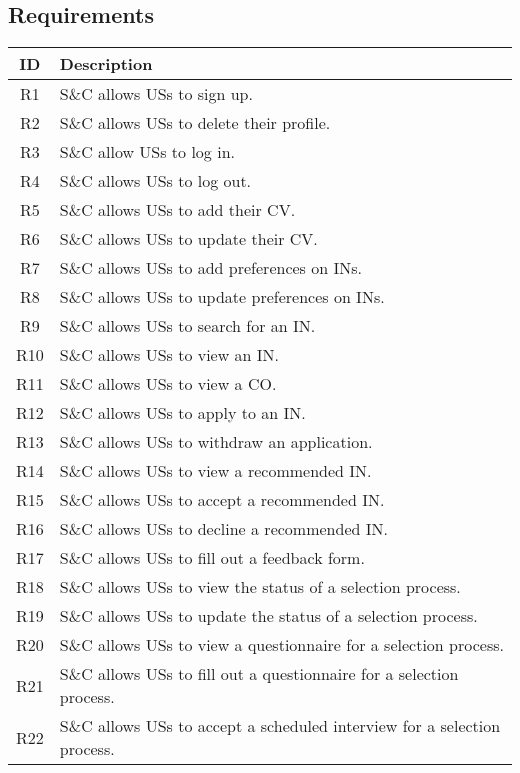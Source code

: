 \subsection{Requirements}
\renewcommand{\arraystretch}{1.5}
\begin{longtable}{|c|p{10.5cm}|}
    \hline \rowcolor{polimiblue!40}
    \textbf{ID} & \textbf{Description} \\ \hline
    R1 & S\&C allows USs to sign up. \\ \hline
    R2 & S\&C allows USs to delete their profile.\\ \hline
    R3 & S\&C allow USs to log in. \\ \hline
    R4 & S\&C allows USs to log out. \\ \hline
    R5 & S\&C allows USs to add their CV. \\ \hline
    R6 & S\&C allows USs to update their CV. \\ \hline
    R7 & S\&C allows USs to add preferences on INs. \\ \hline
    R8 & S\&C allows USs to update preferences on INs. \\ \hline
    R9 & S\&C allows USs to search for an IN. \\ \hline
    R10 & S\&C allows USs to view an IN. \\ \hline
    R11 & S\&C allows USs to view a CO. \\ \hline
    R12 & S\&C allows USs to apply to an IN. \\ \hline
    R13 & S\&C allows USs to withdraw an application. \\ \hline
    R14 & S\&C allows USs to view a recommended IN. \\ \hline
    R15 & S\&C allows USs to accept a recommended IN. \\ \hline
    R16 & S\&C allows USs to decline a recommended IN. \\ \hline
    R17 & S\&C allows USs to fill out a feedback form. \\ \hline
    R18 & S\&C allows USs to view the status of a selection process. \\ \hline
    R19 & S\&C allows USs to update the status of a selection process. \\ \hline
    R20 & S\&C allows USs to view a questionnaire for a selection process. \\ \hline
    R21 & S\&C allows USs to fill out a questionnaire for a selection process. \\ \hline
    R22 & S\&C allows USs to accept a scheduled interview for a selection process. \\ \hline

\end{longtable}
